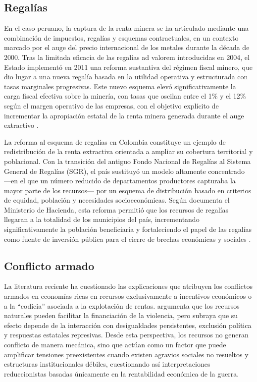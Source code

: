 \documentclass[../../TFM.tex]{subfiles}
\begin{document}
	\subsection{Regalías}
	\label{subsec:regalias}
	
	En el caso peruano, la captura de la renta minera se ha articulado mediante una combinación de impuestos, regalías y esquemas contractuales, en un contexto marcado por el auge del precio internacional de los metales durante la década de 2000. Tras la limitada eficacia de las regalías ad valorem introducidas en 2004, el Estado implementó en 2011 una reforma sustantiva del régimen fiscal minero, que dio lugar a una nueva regalía basada en la utilidad operativa y estructurada con tasas marginales progresivas. Este nuevo esquema elevó significativamente la carga fiscal efectiva sobre la minería, con tasas que oscilan entre el 1\% y el 12\% según el margen operativo de las empresas, con el objetivo explícito de incrementar la apropiación estatal de la renta minera generada durante el auge extractivo \parencite{TorresCuzcano2018}.
	
	La reforma al esquema de regalías en Colombia constituye un ejemplo de redistribución de la renta extractiva orientada a ampliar su cobertura territorial y poblacional. Con la transición del antiguo Fondo Nacional de Regalías al Sistema General de Regalías (SGR), el país sustituyó un modelo altamente concentrado —en el que un número reducido de departamentos productores capturaba la mayor parte de los recursos— por un esquema de distribución basado en criterios de equidad, población y necesidades socioeconómicas. Según documenta el Ministerio de Hacienda, esta reforma permitió que los recursos de regalías llegaran a la totalidad de los municipios del país, incrementando significativamente la población beneficiaria y fortaleciendo el papel de las regalías como fuente de inversión pública para el cierre de brechas económicas y sociales \parencite{MaraRamrez2018}.
	
	\subsection{Conflicto armado}
	\label{subsec:conflicto}
	
	La literatura reciente ha cuestionado las explicaciones que atribuyen los conflictos armados en economías ricas en recursos exclusivamente a incentivos económicos o a la “codicia” asociada a la explotación de rentas. \textcite{Keen2012} argumenta que los recursos naturales pueden facilitar la financiación de la violencia, pero subraya que su efecto depende de la interacción con desigualdades persistentes, exclusión política y respuestas estatales represivas. Desde esta perspectiva, los recursos no generan conflicto de manera mecánica, sino que actúan como un factor que puede amplificar tensiones preexistentes cuando existen agravios sociales no resueltos y estructuras institucionales débiles, cuestionando así interpretaciones reduccionistas basadas únicamente en la rentabilidad económica de la guerra.
	
\end{document}
